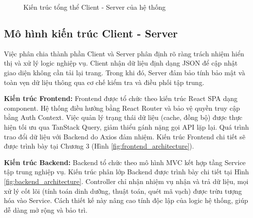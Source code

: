 \documentclass[12pt, a4paper]{report}
\begin{document}
\begin{figure}[htbp]
{
    }
    \caption{Kiến trúc tổng thể Client - Server của hệ thống}
    \label{fig:kientruc_tongthe}
\end{figure}

\subsection{Mô hình kiến trúc Client - Server}
Việc phân chia thành phần Client và Server phân định rõ ràng trách nhiệm hiển thị và xử lý logic nghiệp vụ. Client nhận dữ liệu định dạng JSON để cập nhật giao diện không cần tải lại trang. Trong khi đó, Server đảm bảo tính bảo mật và toàn vẹn dữ liệu thông qua cơ chế kiểm tra và điều phối tập trung.

\textbf{Kiến trúc Frontend:} Frontend được tổ chức theo kiến trúc React SPA dạng component. Hệ thống điều hướng bằng React Router và bảo vệ quyền truy cập bằng Auth Context. Việc quản lý trạng thái dữ liệu (cache, đồng bộ) được thực hiện tối ưu qua TanStack Query, giảm thiểu gánh nặng gọi API lặp lại. Quá trình trao đổi dữ liệu với Backend do Axios đảm nhiệm. Kiến trúc Frontend chi tiết sẽ được trình bày tại Chương 3 (Hình \ref{fig:frontend_architecture}).

\textbf{Kiến trúc Backend:} Backend tổ chức theo mô hình MVC kết hợp tầng Service tập trung nghiệp vụ. Kiến trúc phân lớp Backend được trình bày chi tiết tại Hình \ref{fig:backend_architecture}. Controller chỉ nhận nhiệm vụ nhận và trả dữ liệu, mọi xử lý cốt lõi (tính toán dinh dưỡng, thuật toán, quét mã vạch) được trừu tượng hóa vào Service. Cách thiết kế này nâng cao tính độc lập của logic hệ thống, giúp dễ dàng mở rộng và bảo trì.
\end{document}
